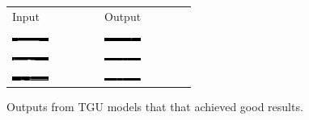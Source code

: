 \begin{figure}
\centering
	\begin{tabu} to \textwidth {XX}
		Input & Output \\
		\includegraphics[width=0.45\textwidth, interpolate=false]{exps/vbind/100x1tguinput} & 
		\includegraphics[width=0.45\textwidth, interpolate=false]{exps/vbind/100x1tguoutput} \\
		\includegraphics[width=0.45\textwidth, interpolate=false]{exps/vbind/100x2tguinput} & 
		\includegraphics[width=0.45\textwidth, interpolate=false]{exps/vbind/100x2tguoutput} \\
		\includegraphics[width=0.45\textwidth, interpolate=false]{exps/vbind/100x3tguinput} & 
		\includegraphics[width=0.45\textwidth, interpolate=false]{exps/vbind/100x3tguoutput} \\
	\end{tabu}
	\caption[Example successful outputs for variable binding]{Outputs from TGU models that that
	achieved good results.}
	\label{fig:vbindcorrect}
\end{figure}

